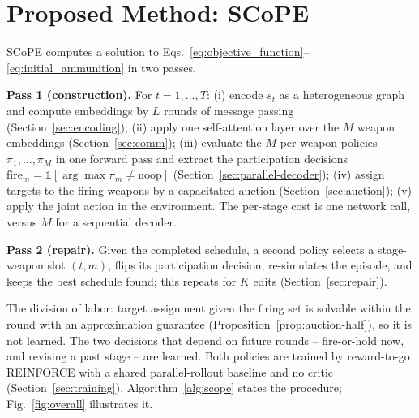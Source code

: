\section{Proposed Method: SCoPE}
\label{sec:method}

SCoPE computes a solution to Eqs.~\eqref{eq:objective_function}--\eqref{eq:initial_ammunition} in two passes.

\textbf{Pass 1 (construction).} For $t = 1, \ldots, T$: (i) encode $s_t$ as a heterogeneous graph and compute embeddings by $L$ rounds of message passing (Section~\ref{sec:encoding}); (ii) apply one self-attention layer over the $M$ weapon embeddings (Section~\ref{sec:comm}); (iii) evaluate the $M$ per-weapon policies $\pi_1, \ldots, \pi_M$ in one forward pass and extract the participation decisions $\text{fire}_m = \mathbb{1}[\arg\max \pi_m \neq \text{noop}]$ (Section~\ref{sec:parallel-decoder}); (iv) assign targets to the firing weapons by a capacitated auction (Section~\ref{sec:auction}); (v) apply the joint action in the environment. The per-stage cost is one network call, versus $M$ for a sequential decoder.

\textbf{Pass 2 (repair).} Given the completed schedule, a second policy selects a stage-weapon slot $(t,m)$, flips its participation decision, re-simulates the episode, and keeps the best schedule found; this repeats for $K$ edits (Section~\ref{sec:repair}).

The division of labor: target assignment given the firing set is solvable within the round with an approximation guarantee (Proposition~\ref{prop:auction-half}), so it is not learned. The two decisions that depend on future rounds -- fire-or-hold now, and revising a past stage -- are learned. Both policies are trained by reward-to-go REINFORCE with a shared parallel-rollout baseline and no critic (Section~\ref{sec:training}). Algorithm~\ref{alg:scope} states the procedure; Fig.~\ref{fig:overall} illustrates it.

